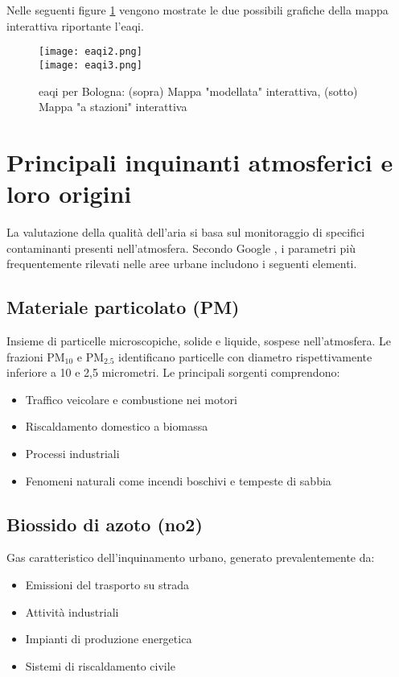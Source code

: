 Nelle seguenti figure \ref{fig:eaqi-combined} vengono mostrate le due possibili grafiche della mappa interattiva
riportante l'\acrfull{eaqi}.

\begin{figure}[H]
  \centering
  \texttt{[image: eaqi2.png]}\\[1em]
  \texttt{[image: eaqi3.png]}
  \caption{\acrfull{eaqi} per Bologna: (sopra) Mappa "modellata" interattiva, (sotto) Mappa "a stazioni" interattiva}
  \label{fig:eaqi-combined}
\end{figure}

\section{Principali inquinanti atmosferici e loro origini}

La valutazione della qualità dell'aria si basa sul monitoraggio di specifici contaminanti presenti nell'atmosfera.
Secondo Google \cite{GoogleMapsAirQuality2024}, i parametri più frequentemente rilevati nelle aree urbane includono
i seguenti elementi.

\subsection{Materiale particolato (PM)}

Insieme di particelle microscopiche, solide e liquide, sospese nell'atmosfera.
Le frazioni PM$_{10}$ e PM$_{2.5}$ identificano particelle con diametro rispettivamente inferiore a 10 e 2,5 micrometri.
Le principali sorgenti comprendono:

\begin{itemize}
  \item Traffico veicolare e combustione nei motori
  \item Riscaldamento domestico a biomassa
  \item Processi industriali
  \item Fenomeni naturali come incendi boschivi e tempeste di sabbia
\end{itemize}

\subsection{Biossido di azoto (\acrshort{no2})}

Gas caratteristico dell'inquinamento urbano, generato prevalentemente da:

\begin{itemize}
  \item Emissioni del trasporto su strada
  \item Attività industriali
  \item Impianti di produzione energetica
  \item Sistemi di riscaldamento civile
\end{itemize}

